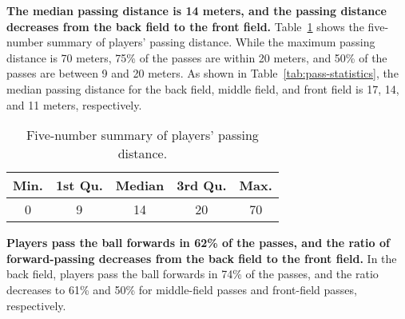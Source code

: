 \textbf{The median passing distance is 14 meters, and the passing distance decreases from the back field to the front field.}
Table~\ref{tab:pass-dist} shows the five-number summary of players' passing distance. While the maximum passing distance is 70 meters, 75\% of the passes are within 20 meters, and 50\% of the passes are between 9 and 20 meters.
As shown in Table~\ref{tab:pass-statistics}, the median passing distance for the back field, middle field, and front field is 17, 14, and 11 meters, respectively.

\begin{table}[!t]
\caption{Five-number summary of players' passing distance.}
\centering
\renewcommand{\tabcolsep}{3pt}
\begin{tabular}{c c c c c}
\toprule
Min. & 1st Qu. & Median & 3rd Qu. & Max. \\
\midrule
0 & 9 & 14 & 20 & 70 \\
\bottomrule
\end{tabular}
\label{tab:pass-dist}
\end{table}

\textbf{Players pass the ball forwards in 62\% of the passes, and the ratio of forward-passing decreases from the back field to the front field.} In the back field, players pass the ball forwards in 74\% of the passes, and the ratio decreases to 61\% and 50\% for middle-field passes and front-field passes, respectively.


